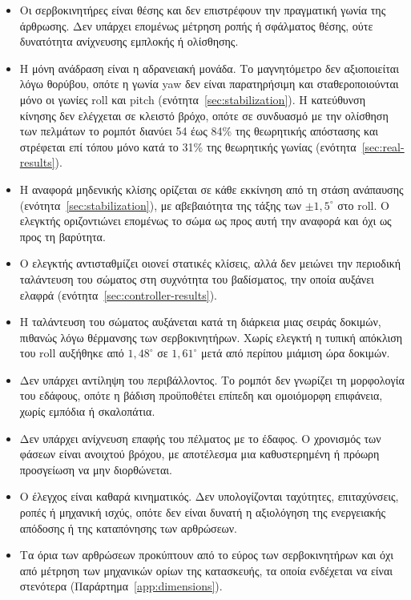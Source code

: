 \documentclass[11pt]{report}
\begin{document}
\begin{itemize}
  \item Οι σερβοκινητήρες είναι θέσης και δεν επιστρέφουν την πραγματική γωνία
  της άρθρωσης. Δεν υπάρχει επομένως μέτρηση ροπής ή σφάλματος θέσης, ούτε
  δυνατότητα ανίχνευσης εμπλοκής ή ολίσθησης.
  \item Η μόνη ανάδραση είναι η αδρανειακή μονάδα. Το μαγνητόμετρο δεν
  αξιοποιείται λόγω θορύβου, οπότε η γωνία yaw δεν είναι παρατηρήσιμη και
  σταθεροποιούνται μόνο οι γωνίες roll και pitch
  (ενότητα~\ref{sec:stabilization}). Η κατεύθυνση κίνησης δεν ελέγχεται σε
  κλειστό βρόχο, οπότε σε συνδυασμό με την ολίσθηση των πελμάτων το ρομπότ
  διανύει 54 έως 84\% της θεωρητικής απόστασης και στρέφεται επί τόπου μόνο
  κατά το 31\% της θεωρητικής γωνίας (ενότητα~\ref{sec:real-results}).
  \item Η αναφορά μηδενικής κλίσης ορίζεται σε κάθε εκκίνηση από τη στάση
  ανάπαυσης (ενότητα~\ref{sec:stabilization}), με αβεβαιότητα της τάξης των
  $\pm 1{,}5^\circ$ στο roll. Ο ελεγκτής οριζοντιώνει επομένως το σώμα ως προς
  αυτή την αναφορά και όχι ως προς τη βαρύτητα.
  \item Ο ελεγκτής αντισταθμίζει οιονεί στατικές κλίσεις, αλλά δεν μειώνει την
  περιοδική ταλάντευση του σώματος στη συχνότητα του βαδίσματος, την οποία
  αυξάνει ελαφρά (ενότητα~\ref{sec:controller-results}).
  \item Η ταλάντευση του σώματος αυξάνεται κατά τη διάρκεια μιας σειράς
  δοκιμών, πιθανώς λόγω θέρμανσης των σερβοκινητήρων. Χωρίς ελεγκτή η τυπική
  απόκλιση του roll αυξήθηκε από $1{,}48^\circ$ σε $1{,}61^\circ$ μετά από
  περίπου μιάμιση ώρα δοκιμών.
  \item Δεν υπάρχει αντίληψη του περιβάλλοντος. Το ρομπότ δεν γνωρίζει τη
  μορφολογία του εδάφους, οπότε η βάδιση προϋποθέτει επίπεδη και ομοιόμορφη
  επιφάνεια, χωρίς εμπόδια ή σκαλοπάτια.
  \item Δεν υπάρχει ανίχνευση επαφής του πέλματος με το έδαφος. Ο χρονισμός των
  φάσεων είναι ανοιχτού βρόχου, με αποτέλεσμα μια καθυστερημένη ή πρόωρη
  προσγείωση να μην διορθώνεται.
  \item Ο έλεγχος είναι καθαρά κινηματικός. Δεν υπολογίζονται ταχύτητες,
  επιταχύνσεις, ροπές ή μηχανική ισχύς, οπότε δεν είναι δυνατή η αξιολόγηση της
  ενεργειακής απόδοσης ή της καταπόνησης των αρθρώσεων.
  \item Τα όρια των αρθρώσεων προκύπτουν από το εύρος των σερβοκινητήρων και όχι
  από μέτρηση των μηχανικών ορίων της κατασκευής, τα οποία ενδέχεται να είναι
  στενότερα (Παράρτημα~\ref{app:dimensions}).

\end{itemize}
\end{document}
